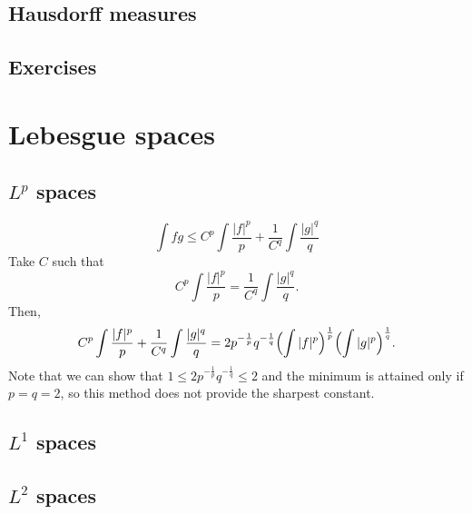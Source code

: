 \documentclass{../../large}
\begin{document}
\section{Hausdorff measures}


\section*{Exercises}











\chapter{Lebesgue spaces}
\section{$L^p$ spaces}

\begin{prb}
\end{prb}
\begin{pf}
\[\int fg\le C^p\int\frac{|f|^p}p+\frac1{C^q}\int\frac{|g|^q}q\]
Take $C$ such that
\[C^p\int\frac{|f|^p}p=\frac1{C^q}\int\frac{|g|^q}q.\]
Then,
\[C^p\int\frac{|f|^p}p+\frac1{C^q}\int\frac{|g|^q}q=2p^{-\frac1p}q^{-\frac1q}\Bigl(\int|f|^p\Bigr)^{\frac1p}\Bigl(\int|g|^p\Bigr)^{\frac1q}.\]
Note that we can show that $1\le2p^{-\frac1p}q^{-\frac1q}\le2$ and the minimum is attained only if $p=q=2$, so this method does not provide the sharpest constant.
\end{pf}


\section{$L^1$ spaces}

\begin{prb}[Convolution?]
\end{prb}
\begin{prb}
\end{prb}
\begin{prb}
\end{prb}

\section{$L^2$ spaces}
\end{document}
